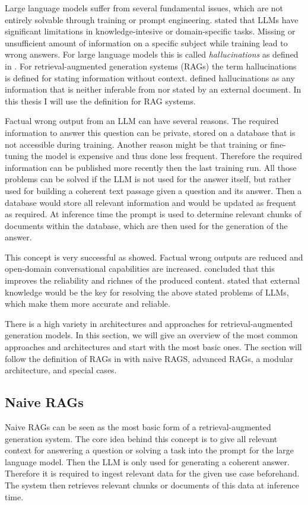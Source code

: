 Large language models suffer from several fundamental issues, which are not entirely solvable through training or prompt engineering. 
\citet{Gao.18.12.2023} stated that LLMs have significant limitations in knowledge-intesive or domain-specific tasks. Missing or unsufficient amount of information on a specific subject while training lead to wrong answers. For large language models this is called \textit{hallucinations} as defined in \citet{Huang.2023}. For retrieval-augmented generation systems (RAGs) the term hallucinations is defined for stating information without context. \citet{Rashkin.} defined hallucinations as any information that is neither inferable from nor stated by an external document. In this thesis I will use the definition for RAG systems. 

Factual wrong output from an LLM can have several reasons. The required information to answer this question can be private, stored on a database that is not accessible during training. Another reason might be that training or fine-tuning the model is expensive and thus done less frequent. Therefore the required information can be published more recently then the last training run. All those problems can be solved if the LLM is not used for the answer itself, but rather used for building a coherent text passage given a question and its answer. Then a database would store all relevant information and would be updated as frequent as required. At inference time the prompt is used to determine relevant chunks of documents within the database, which are then used for the generation of the answer.

This concept is very successful as \citet{Shuster.} showed. Factual wrong outputs are reduced and open-domain conversational capabilities are increased. \citet{Yu.2024} concluded that this improves the reliability and richnes of the produced content. \citet{Chen.2024} stated that external knowledge would be the key for resolving the above stated problems of LLMs, which make them more accurate and reliable.

There is a high variety in architectures and approaches for retrieval-augmented generation models. In this section, we will give an overview of the most common approaches and architectures and start with the most basic ones. The section will follow the definition of RAGs in \citet{Gao.18.12.2023} with naive RAGS, advanced RAGs, a modular architecture, and special cases. 

\subsection{Naive RAGs}
\label{sec:naive_rags}
Naive RAGs can be seen as the most basic form of a retrieval-augmented generation system. The core idea behind this concept is to give all relevant context for answering a question or solving a task into the prompt for the large language model. Then the LLM is only used for generating a coherent answer. Therefore it is required to ingest relevant data for the given use case beforehand. The system then retrieves relevant chunks or documents of this data at inference time. 


